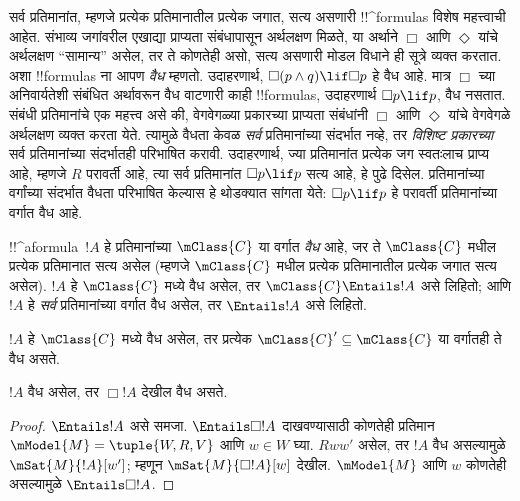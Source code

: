 \documentclass[../../../include/open-logic-section]{subfiles}
\begin{document}


\begin{explain}
  सर्व प्रतिमानांत, म्हणजे प्रत्येक प्रतिमानातील प्रत्येक जगात, सत्य
  असणारी !!^{formula}s विशेष महत्त्वाची आहेत. संभाव्य जगांवरील
  एखाद्या प्राप्यता संबंधापासून अर्थलक्षण मिळते, या अर्थाने
  $\Box$ आणि $\Diamond$ यांचे अर्थलक्षण ``सामान्य'' असेल,
  तर ते कोणतेही असो, सत्य असणारी मोडल विधाने ही सूत्रे व्यक्त
  करतात. अशा !!{formula}s ना आपण \emph{वैध} म्हणतो. उदाहरणार्थ,
  $\Box(p \land q) \lif \Box p$ हे वैध आहे. मात्र $\Box$
  च्या अनिवार्यतेशी संबंधित अर्थावरून वैध वाटणारी काही
  !!{formula}s, उदाहरणार्थ $\Box p \lif p$, वैध नसतात.
  संबंधी प्रतिमानांचे एक महत्त्व असे की, वेगवेगळ्या प्रकारच्या
  प्राप्यता संबंधांनी $\Box$ आणि $\Diamond$ यांचे वेगवेगळे
  अर्थलक्षण व्यक्त करता येते. त्यामुळे वैधता केवळ \emph{सर्व}
  प्रतिमानांच्या संदर्भात नव्हे, तर \emph{विशिष्ट प्रकारच्या}
  सर्व प्रतिमानांच्या संदर्भातही परिभाषित करावी. उदाहरणार्थ,
  ज्या प्रतिमानांत प्रत्येक जग स्वतःलाच प्राप्य आहे, म्हणजे
  $R$ परावर्ती आहे, त्या सर्व प्रतिमानांत $\Box p \lif p$
  सत्य आहे, हे पुढे दिसेल. प्रतिमानांच्या वर्गांच्या संदर्भात
  वैधता परिभाषित केल्यास हे थोडक्यात सांगता येते:
  $\Box p \lif p$ हे परावर्ती प्रतिमानांच्या वर्गात वैध आहे.
\end{explain}

\begin{defn}
  !!^a{formula}~$!A$ हे प्रतिमानांच्या $\mClass{C}$ या वर्गात
  \emph{वैध} आहे, जर ते $\mClass{C}$ मधील प्रत्येक प्रतिमानात
  सत्य असेल (म्हणजे $\mClass{C}$ मधील प्रत्येक प्रतिमानातील
  प्रत्येक जगात सत्य असेल). $!A$ हे $\mClass{C}$ मध्ये वैध
  असेल, तर $\mClass{C} \Entails !A$ असे लिहितो; आणि $!A$
  हे \emph{सर्व} प्रतिमानांच्या वर्गात वैध असेल, तर
  $\Entails !A$ असे लिहितो.
\end{defn}

\begin{prop}
  $!A$ हे $\mClass{C}$ मध्ये वैध असेल, तर प्रत्येक
  $\mClass{C}' \subseteq \mClass{C}$ या वर्गातही ते वैध असते.
\end{prop}

\begin{prop}
  $!A$ वैध असेल, तर $\Box!A$ देखील वैध असते.
\end{prop}

\begin{proof}
  $\Entails !A$ असे समजा. $\Entails \Box!A$ दाखवण्यासाठी
  कोणतेही प्रतिमान $\mModel{M} = \tuple{W, R, V}$ आणि
  $w \in W$ घ्या. $Rww'$ असेल, तर $!A$ वैध असल्यामुळे
  $\mSat{M}{!A}[w']$; म्हणून $\mSat{M}{\Box!A}[w]$ देखील.
  $\mModel{M}$ आणि $w$ कोणतेही असल्यामुळे
  $\Entails \Box!A$.
\end{proof}
\end{document}
